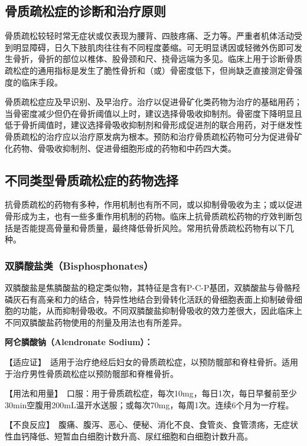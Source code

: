 \subsection{骨质疏松症的诊断和治疗原则}

骨质疏松较轻时常无症状或仅表现为腰背、四肢疼痛、乏力等。严重者机体活动受到明显障碍，日久下肢肌肉往往有不同程度萎缩。可无明显诱因或轻微外伤即可发生骨折，骨折的部位以椎体、股骨颈和尺、挠骨远端为多见。临床上用于诊断骨质疏松症的通用指标是发生了脆性骨折和（或）骨密度低下，但尚缺乏直接测定骨强度的临床手段。

骨质疏松症应及早识别、及早治疗。治疗以促进骨矿化类药物为治疗的基础用药；当骨密度减少但仍在骨折阈值以上时，建议选择骨吸收抑制剂。骨密度下降明显且低于骨折阈值时，建议选择骨吸收抑制剂和骨形成促进剂的联合用药，对于继发性骨质疏松的治疗应以治疗原发病为根本。预防和治疗骨质疏松药物可分为促进骨矿化药物、骨吸收抑制剂、促进骨细胞形成的药物和中药四大类。

\subsection{不同类型骨质疏松症的药物选择}

抗骨质疏松的药物有多种，作用机制也有所不同，或以抑制骨吸收为主；或以促进骨形成为主，也有一些多重作用机制的药物。临床上抗骨质疏松药物的疗效判断包括是否能提高骨量和骨质量，最终降低骨折风险。常用抗骨质疏松药物有以下几种。

\subsubsection{双膦酸盐类（Bisphosphonates）}

双膦酸盐是焦膦酸盐的稳定类似物，其特征是含有P-C-P基团，双膦酸盐与骨骼羟磷灰石有高亲和力的结合，特异性地结合到骨转化活跃的骨细胞表面上抑制破骨细胞的功能，从而抑制骨吸收。不同双膦酸盐抑制骨吸收的效力差很大，因此临床上不同双膦酸盐药物使用的剂量及用法也有所差异。

\textbf{阿仑膦酸钠（Alendronate Sodium）：}

【适应证】　适用于治疗绝经后妇女的骨质疏松症，以预防髋部和脊柱骨折。适用于治疗男性骨质疏松症以预防髋部和脊椎骨折。

【用法和用量】　口服：用于骨质疏松症，每次10mg，每日1次，每日早餐前至少30min空腹用200mL温开水送服；或每次70mg，每周1次。连续6个月为一疗程。

【不良反应】　腹痛、腹泻、恶心、便秘、消化不良、食管炎、食管溃疡，无症状性血钙降低、短暂血白细胞计数升高、尿红细胞和白细胞计数升高。

